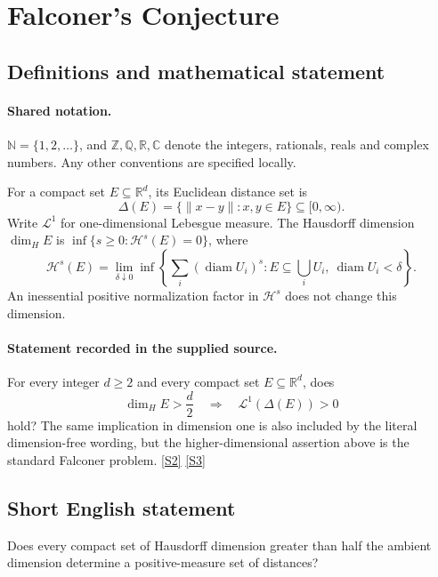 \documentclass[11pt]{article}
\newcommand{\sref}[2]{\hyperlink{source:#1:#2}{[S#2]}}
\begin{document}
\section{Falconer's Conjecture}\label{statement}

\subsection{Definitions and mathematical statement}

\paragraph{Shared notation.}$\mathbb N=\{1,2,\ldots\}$, and $\mathbb Z,\mathbb Q,\mathbb R,\mathbb C$ denote the integers, rationals, reals and complex numbers. Any other conventions are specified locally.


For a compact set \(E\subseteq\mathbb R^d\), its Euclidean
distance set is
\[
 \Delta(E)=\{\|x-y\|:x,y\in E\}\subseteq[0,\infty).
\]
Write \(\mathcal L^1\) for one-dimensional Lebesgue measure.
The Hausdorff dimension \(\dim_H E\) is
\(\inf\{s\ge0:\mathcal H^s(E)=0\}\), where
\[
 \mathcal H^s(E)=
 \lim_{\delta\downarrow0}\inf
 \left\{\sum_i(\operatorname{diam}U_i)^s:
       E\subseteq\bigcup_iU_i,\ \operatorname{diam}U_i<\delta\right\}.
\]
An inessential positive normalization factor in \(\mathcal H^s\)
does not change this dimension.
\paragraph{Statement recorded in the supplied source.}
For every integer \(d\ge2\) and every compact set
\(E\subseteq\mathbb R^d\), does
\[
 \dim_H E>\frac d2
       \quad\Longrightarrow\quad
 \mathcal L^1(\Delta(E))>0
\]
hold?  The same implication in dimension one is also included by
the literal dimension-free wording, but the higher-dimensional
assertion above is the standard Falconer problem. \sref{statement}{2} \sref{statement}{3}
\subsection{Short English statement}
Does every compact set of Hausdorff dimension greater than half the ambient dimension determine a positive-measure set of distances?
\end{document}
